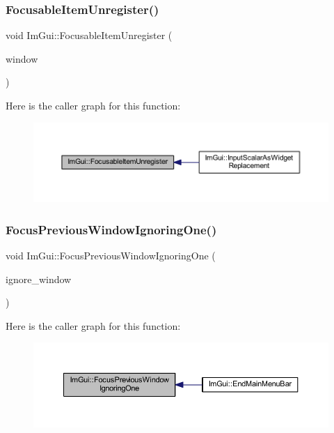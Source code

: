 \subsubsection{\texorpdfstring{Focusable\+Item\+Unregister()}{FocusableItemUnregister()}}
{\footnotesize\ttfamily void Im\+Gui\+::\+Focusable\+Item\+Unregister (\begin{DoxyParamCaption}\item[{\mbox{\hyperlink{struct_im_gui_window}{Im\+Gui\+Window}} $\ast$}]{window }\end{DoxyParamCaption})}

Here is the caller graph for this function\+:
\nopagebreak
\begin{figure}[H]
\begin{center}
\leavevmode
\includegraphics[width=350pt]{namespace_im_gui_a390518fcaef04b4d399d2475d4d84df7_icgraph}
\end{center}
\end{figure}
\mbox{\label{namespace_im_gui_afbd916bd6d921233e57bfdf1309dae65}} 
\subsubsection{\texorpdfstring{Focus\+Previous\+Window\+Ignoring\+One()}{FocusPreviousWindowIgnoringOne()}}
{\footnotesize\ttfamily void Im\+Gui\+::\+Focus\+Previous\+Window\+Ignoring\+One (\begin{DoxyParamCaption}\item[{\mbox{\hyperlink{struct_im_gui_window}{Im\+Gui\+Window}} $\ast$}]{ignore\+\_\+window }\end{DoxyParamCaption})}

Here is the caller graph for this function\+:
\nopagebreak
\begin{figure}[H]
\begin{center}
\leavevmode
\includegraphics[width=350pt]{namespace_im_gui_afbd916bd6d921233e57bfdf1309dae65_icgraph}
\end{center}
\end{figure}
\mbox{\label{namespace_im_gui_ade4c08e7e7ad7bbfa4835248f5f3a7c6}} 
